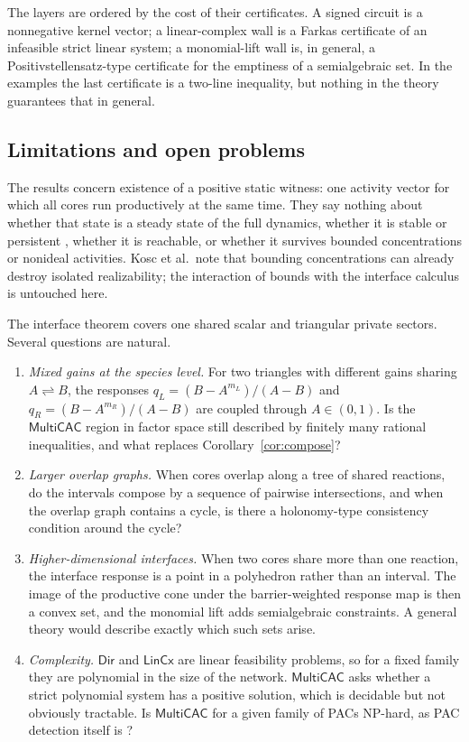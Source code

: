 \documentclass[11pt,a4paper]{article}
\theoremstyle{plain}
\theoremstyle{definition}
\theoremstyle{remark}
\newcommand{\MCAC}{\mathsf{MultiCAC}}
\newcommand{\DIR}{\mathsf{Dir}}
\newcommand{\LIN}{\mathsf{LinCx}}
\newcommand{\rev}{\rightleftharpoons}
\begin{document}
The layers are ordered by the cost of their certificates. A signed circuit is a nonnegative kernel vector; a linear-complex wall is a Farkas certificate of an infeasible strict linear system; a monomial-lift wall is, in general, a Positivstellensatz-type certificate for the emptiness of a semialgebraic set. In the examples the last certificate is a two-line inequality, but nothing in the theory guarantees that in general.

\subsection{Limitations and open problems}

The results concern existence of a positive static witness: one activity vector for which all cores run productively at the same time. They say nothing about whether that state is a steady state of the full dynamics, whether it is stable or persistent \citep{vassena2024}, whether it is reachable, or whether it survives bounded concentrations or nonideal activities. Kosc et al.\ note that bounding concentrations can already destroy isolated realizability; the interaction of bounds with the interface calculus is untouched here.

The interface theorem covers one shared scalar and triangular private sectors. Several questions are natural.
\begin{enumerate}
\item \emph{Mixed gains at the species level.} For two triangles with different gains sharing $A\rev B$, the responses $q_L=(B-A^{m_L})/(A-B)$ and $q_R=(B-A^{m_R})/(A-B)$ are coupled through $A\in(0,1)$. Is the $\MCAC$ region in factor space still described by finitely many rational inequalities, and what replaces Corollary~\ref{cor:compose}?
\item \emph{Larger overlap graphs.} When cores overlap along a tree of shared reactions, do the intervals compose by a sequence of pairwise intersections, and when the overlap graph contains a cycle, is there a holonomy-type consistency condition around the cycle?
\item \emph{Higher-dimensional interfaces.} When two cores share more than one reaction, the interface response is a point in a polyhedron rather than an interval. The image of the productive cone under the barrier-weighted response map is then a convex set, and the monomial lift adds semialgebraic constraints. A general theory would describe exactly which such sets arise.
\item \emph{Complexity.} $\DIR$ and $\LIN$ are linear feasibility problems, so for a fixed family they are polynomial in the size of the network. $\MCAC$ asks whether a strict polynomial system has a positive solution, which is decidable but not obviously tractable. Is $\MCAC$ for a given family of PACs NP-hard, as PAC detection itself is \citep{kosc2025,andersen2012}?
\end{enumerate}
\end{document}
